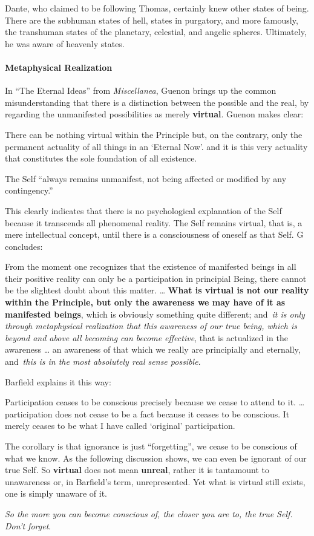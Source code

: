 Dante, who claimed to be following Thomas, certainly knew other states of being. There are the subhuman states of hell, states in purgatory, and more famously, the transhuman states of the planetary, celestial, and angelic spheres. Ultimately, he was aware of heavenly states.

\paragraph{Metaphysical Realization}
In “The Eternal Ideas” from \emph{Miscellanea}, Guenon brings up the common misunderstanding that there is a distinction between the possible and the real, by regarding the unmanifested possibilities as merely \textbf{virtual}. Guenon makes clear:

\begin{quotex}
There can be nothing virtual within the Principle but, on the contrary, only the permanent actuality of all things in an `Eternal Now'. and it is this very actuality that constitutes the sole foundation of all existence.

\end{quotex}
The Self “always remains unmanifest, not being affected or modified by any contingency.”

This clearly indicates that there is no psychological explanation of the Self because it transcends all phenomenal reality. The Self remains virtual, that is, a mere intellectual concept, until there is a consciousness of oneself as that Self. G concludes:

\begin{quotex}
From the moment one recognizes that the existence of manifested beings in all their positive reality can only be a participation in principial Being, there cannot be the slightest doubt about this matter. … \textbf{What is virtual is not our reality within the Principle, but only the awareness we may have of it as manifested beings}, which is obviously something quite different; and \emph{it is only through metaphysical realization that this awareness of our true being, which is beyond and above all becoming can become effective}, that is actualized in the awareness … an awareness of that which we really are principially and eternally, and \emph{this is in the most absolutely real sense possible}.

\end{quotex}
Barfield explains it this way:

\begin{quotex}
Participation ceases to be conscious precisely because we cease to attend to it. … participation does not cease to be a fact because it ceases to be conscious. It merely ceases to be what I have called `original' participation.

\end{quotex}
The corollary is that ignorance is just “forgetting”, we cease to be conscious of what we know. As the following discussion shows, we can even be ignorant of our true Self. So \textbf{virtual} does not mean \textbf{unreal}, rather it is tantamount to unawareness or, in Barfield's term, unrepresented. Yet what is virtual still exists, one is simply unaware of it.

\emph{So the more you can become conscious of, the closer you are to, the true Self. Don't forget}.



